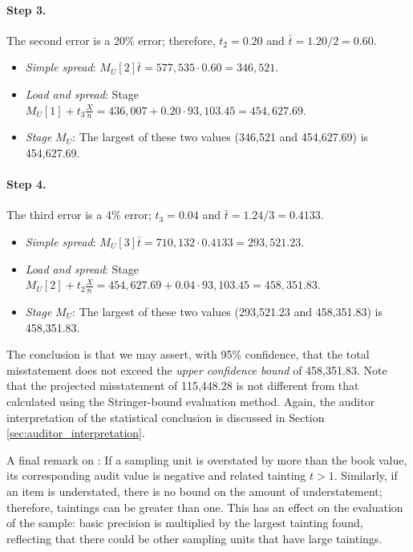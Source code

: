 \paragraph{Step 3.} The second error is a 20\% error; therefore, $t_2 = 0.20$ and $\bar{t} = 1.20 / 2 = 0.60$.

\begin{itemize}
\item \emph{Simple spread}: $M_U[2] \bar{t} = 577,535 \cdot 0.60 = 346,521$.
\item \emph{Load and spread}: Stage $M_U[1] + t_3 \frac{X}{n} = 436,007 + 0.20 \cdot 93,103.45 = 454,627.69$.
\item \emph{Stage} $M_U$: The largest of these two values (346,521 and 454,627.69) is 454,627.69.
\end{itemize}

\paragraph{Step 4.} The third error is a 4\% error; $t_3 = 0.04$ and $\bar{t} = 1.24 / 3 = 0.4133$.

\begin{itemize}
\item \emph{Simple spread}: $M_U[3] \bar{t} = 710,132 \cdot 0.4133 = 293,521.23$.
\item \emph{Load and spread}: Stage $M_U[2] + t_2 \frac{X}{n} = 454,627.69 + 0.04 \cdot 93,103.45 = 458,351.83$.
\item \emph{Stage} $M_U$: The largest of these two values (293,521.23 and 458,351.83) is 458,351.83.
\end{itemize}

\bigskip
The conclusion is that we may assert, with 95\% confidence, that the total misstatement does not exceed the \emph{upper confidence bound} of 458,351.83. Note that the projected misstatement of 115,448.28 is not different from that calculated using the Stringer-bound evaluation method.
Again, the auditor interpretation of the statistical conclusion is discussed in Section \ref{sec:auditor_interpretation}.

\bigskip 
A final remark on : 
If a sampling unit is overstated by more than the book value, its corresponding audit value is negative and  related tainting $t > 1$. 
Similarly, if an item is understated, there is no bound on the amount of understatement; therefore, taintings can be greater than one. 
This has an effect on the evaluation of the sample: basic precision is multiplied by the largest tainting found, reflecting that there could be other sampling units that have large taintings.

